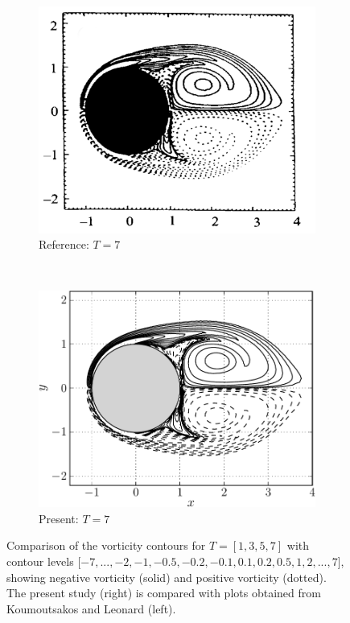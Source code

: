 \begin{figure}[p]
     \begin{subfigure}[t]{0.45\textwidth}
             \includegraphics[height=0.2\textheight]{figures/eulerian/ISC_vorticityContours_t7_ref-mod.png}
             \caption{Reference: $T=7$}
             \label{fig:ISC_vorticityContours_t7_ref}
     \end{subfigure}%
     ~ %
     \begin{subfigure}[t]{0.45\textwidth}
             \includegraphics[height=0.2\textheight]{figures/eulerian/ISC_vorticityContours_t7_fliped-crop.pdf}
             \caption{Present: $T=7$}
             \label{fig:ISC_vorticityContours_t7-crop}
     \end{subfigure}         

     \caption{Comparison of the vorticity contours for $T=[1,3,5,7]$ with contour levels [$-7,...,-2,-1,-0.5,-0.2,-0.1,0.1,0.2,0.5,1,2,...,7$], showing negative vorticity (solid) and positive vorticity (dotted). The present study (right) is compared with plots obtained from Koumoutsakos and Leonard \cite{Koumoutsakos1995a} (left).}
     \label{fig:ISCS_vorticityContours_comparison}
	\end{figure}
	
